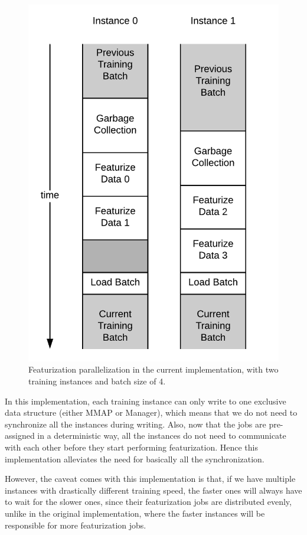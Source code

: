 \documentclass[conference]{IEEEtran}
\begin{document}
\begin{figure}[!htb]
	\includegraphics[width=\linewidth]{ci.png}
	\caption{\small 
		Featurization parallelization in the current implementation, with two training instances and batch size of 4. }
	\label{fig:ci}
\end{figure}

In this implementation, each training instance can only write to one exclusive data structure (either MMAP or Manager), which means that we do not need to synchronize all the instances during writing. 
Also, now that the jobs are pre-assigned in a deterministic way, all the instances do not need to communicate with each other before they start performing featurization. 
Hence this implementation alleviates the need for basically all the synchronization. 

However, the caveat comes with this implementation is that, if we have multiple instances with drastically different training speed, the faster ones will always have to wait for the slower ones, since their featurization jobs are distributed evenly, unlike in the original implementation, where the faster instances will be responsible for more featurization jobs. 
\end{document}
